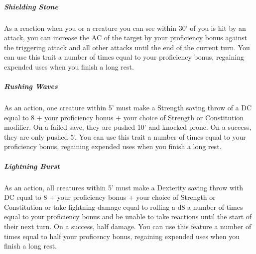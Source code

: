 \subparagraph*{Shielding Stone}  As a reaction when you or a creature you can see within 30' of you is hit by an attack, you can increase the AC of the target by your proficiency bonus against the triggering attack and all other attacks until the end of the current turn. You can use this trait a number of times equal to your proficiency bonus, regaining expended uses when you finish a long rest.

\subparagraph*{Rushing Waves}  As an action, one creature within 5' must make a Strength saving throw of a DC equal to 8 + your proficiency bonus + your choice of Strength or Constitution modifier. On a failed save, they are pushed 10' and knocked prone. On a success, they are only pushed 5'. You can use this trait a number of times equal to your proficiency bonus, regaining expended uses when you finish a long rest.

\subparagraph*{Lightning Burst}  As an action, all creatures within 5' must make a Dexterity saving throw with DC equal to 8 + your proficiency bonus + your choice of Strength or Constitution or take lightning damage equal to rolling a d8 a number of times equal to your proficiency bonus and be unable to take reactions until the start of their next turn. On a success, half damage. You can use this feature a number of times equal to half your proficency bonus, regaining expended uses when you finish a long rest.
